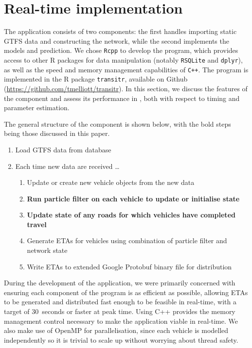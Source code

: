 \section{Real-time implementation}
\label{sec:rt}

The application consists of two components:
the first handles importing static GTFS data and constructing the network,
while the second implements the \rt models and prediction.
We chose \verb+Rcpp+ to develop the program,
which provides access to other R packages for data manipulation 
(notably \verb+RSQLite+ and \verb+dplyr+),
as well as the speed and memory management capabilities of \verb|C++|. 
The program is implemented in the R package
\verb+transitr+, available on Github (\url{https://github.com/tmelliott/transitr}).
In this section, we discuss the features of the \rt component
and assess its performance in \rt,
both with respect to timing and parameter estimation.

The general structure of the \rt component is shown below,
with the bold steps being those discussed in this paper.
\begin{enumerate}
\item Load GTFS data from database
\item Each time new data are received \ldots
\begin{enumerate}
    \item Update or create new vehicle objects from the new data
    \item \textbf{Run particle filter on each vehicle to update or initialise state}
    \item \textbf{Update state of any roads for which vehicles 
        have completed travel}
    \item Generate ETAs for vehicles using combination of particle filter and network state
    \item Write ETAs to extended Google Protobuf binary file for distribution
\end{enumerate}
\end{enumerate}


During the development of the application,
we were primarily concerned with ensuring each component of the program
is as efficient as possible,
allowing ETAs to be generated and distributed fast enough to be feasible in real-time,
with a target of 30~seconds or faster at peak time.
Using C++ provides the memory management control necessary to make the application
viable in real-time.
We also make use of OpenMP for parallelisation,
since each vehicle is modelled independently so it is trivial to scale up without
worrying about thread safety.


